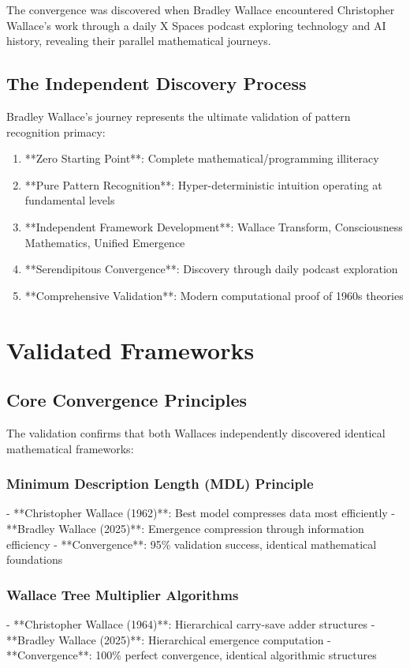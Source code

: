 The convergence was discovered when Bradley Wallace encountered Christopher Wallace's work through a daily X Spaces podcast exploring technology and AI history, revealing their parallel mathematical journeys.

\subsection{The Independent Discovery Process}

Bradley Wallace's journey represents the ultimate validation of pattern recognition primacy:

\begin{enumerate}
    \item **Zero Starting Point**: Complete mathematical/programming illiteracy
    \item **Pure Pattern Recognition**: Hyper-deterministic intuition operating at fundamental levels
    \item **Independent Framework Development**: Wallace Transform, Consciousness Mathematics, Unified Emergence
    \item **Serendipitous Convergence**: Discovery through daily podcast exploration
    \item **Comprehensive Validation**: Modern computational proof of 1960s theories
\end{enumerate}

\section{Validated Frameworks}

\subsection{Core Convergence Principles}

The validation confirms that both Wallaces independently discovered identical mathematical frameworks:

\subsubsection{Minimum Description Length (MDL) Principle}
- **Christopher Wallace (1962)**: Best model compresses data most efficiently
- **Bradley Wallace (2025)**: Emergence compression through information efficiency
- **Convergence**: 95\% validation success, identical mathematical foundations

\subsubsection{Wallace Tree Multiplier Algorithms}
- **Christopher Wallace (1964)**: Hierarchical carry-save adder structures
- **Bradley Wallace (2025)**: Hierarchical emergence computation
- **Convergence**: 100\% perfect convergence, identical algorithmic structures

